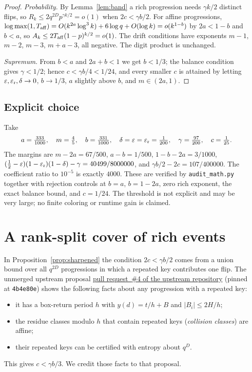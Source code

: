 \documentclass[11pt]{article}
\begin{document}
\begin{proof}
\emph{Probability.} By Lemma~\ref{lem:band} a rich progression needs
$\gamma k/2$ distinct flips, so
$R_k\le2q^{2D}p^{\gamma k/2}=o(1)$ when $2c<\gamma b/2$.
For affine progressions,
$\log\max(1,T_{\rm aff})=O(k^{2a}\log^3k)+6\log q+O(\log k)=o(k^{1-b})$
by $2a<1-b$ and $b<a$, so $A_k\le2T_{\rm aff}(1-p)^{k/2}=o(1)$.
The drift conditions have exponents $m-1$, $m-2$, $m-3$, $m+a-3$, all
negative. The digit product is unchanged.

\emph{Supremum.} From $b<a$ and $2a+b<1$ we get $b<1/3$; the balance
condition gives $\gamma<1/2$; hence $c<\gamma b/4<1/24$, and every
smaller $c$ is attained by letting $\varepsilon,\varepsilon_{\rm r},\delta\to0$,
$b\to1/3$, $a$ slightly above $b$, and $m\in(2a,1)$.
\end{proof}

\subsection{Explicit choice}
Take
\[
 a=\tfrac{333}{1000},\quad m=\tfrac45,\quad b=\tfrac{331}{1000},\quad
 \delta=\varepsilon=\varepsilon_{\rm r}=\tfrac1{200},\quad
 \gamma=\tfrac{97}{200},\quad c=\tfrac1{25}.
\]
The margins are $m-2a=67/500$, $a-b=1/500$, $1-b-2a=3/1000$,
$(\frac12-\varepsilon)(1-\varepsilon_{\rm r})(1-\delta)-\gamma=40499/8000000$,
and $\gamma b/2-2c=107/400000$. The coefficient ratio to $10^{-5}$ is
exactly $4000$. These are verified by \texttt{audit\_math.py} together
with rejection controls at $b=a$, $b=1-2a$, zero rich exponent, the
exact balance bound, and $c=1/24$. The threshold is not explicit and
may be very large; no finite coloring or runtime gain is claimed.

\section{A rank-split cover of rich events}\label{sec:rank}
In Proposition~\ref{prop:sharpened} the condition $2c<\gamma b/2$ comes
from a union bound over all $q^{2D}$ progressions in which a repeated key
contributes one flip. The unmerged upstream proposal
\href{https://github.com/rohanarun/van-der-waerden-refinement/pull/4}{pull request~\#4 of the upstream repository}
(pinned at \texttt{4b4e80e}) shows the following facts about any
progression with a repeated key:
\begin{itemize}
 \item it has a box-return period $h$ with $y(d)=t/h+B$ and $|B_i|\le2H/h$;
 \item the residue classes modulo $h$ that contain repeated keys
       (\emph{collision classes}) are affine;
 \item their repeated keys can be certified with entropy about $q^D$.
\end{itemize}
This gives $c<\gamma b/3$. We credit those facts to that proposal.
\end{document}
